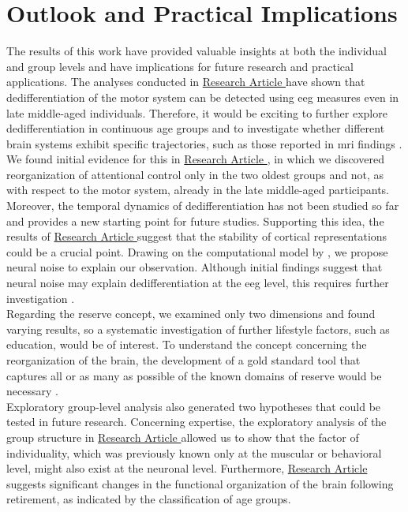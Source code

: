 \section{Outlook and Practical Implications}
The results of this work have provided valuable insights at both the individual and group levels and have implications for future research and practical applications. The analyses conducted in \hyperref[results:paperI]{Research Article } have shown that dedifferentiation of the motor system can be detected using \gls{eeg} measures even in late middle-aged individuals. Therefore, it would be exciting to further explore dedifferentiation in continuous age groups and to investigate whether different brain systems exhibit specific trajectories, such as those reported in \gls{mri} findings \cite{Raz2006}. We found initial evidence for this in \hyperref[results:paperII]{Research Article }, in which we discovered reorganization of attentional control only in the two oldest groups and not, as with respect to the motor system, already in the late middle-aged participants.\\
Moreover, the temporal dynamics of dedifferentiation has not been studied so far and provides a new starting point for future studies. Supporting this idea, the results of \hyperref[results:paperIII]{Research Article } suggest that the stability of cortical representations could be a crucial point. Drawing on the computational model by \citeauthor{Li2001} \cite{Li2001, Li2000}, we propose neural noise to explain our observation. Although initial findings suggest that neural noise may explain dedifferentiation at the \gls{eeg} level, this requires further investigation \cite{Pichot2022}.\\
Regarding the reserve concept, we examined only two dimensions and found varying results, so a systematic investigation of further lifestyle factors, such as education, would be of interest. To understand the concept concerning the reorganization of the brain, the development of a gold standard tool that captures all or as many as possible of the known domains of reserve would be necessary \cite{Nogueira2022}.\\
Exploratory group-level analysis also generated two hypotheses that could be tested in future research. Concerning expertise, the exploratory analysis of the group structure in \hyperref[results:paperIII]{Research Article } allowed us to show that the factor of individuality, which was previously known only at the muscular or behavioral level, might also exist at the neuronal level. Furthermore, \hyperref[results:paperII]{Research Article } suggests significant changes in the functional organization of the brain following retirement, as indicated by the classification of age groups.\\
